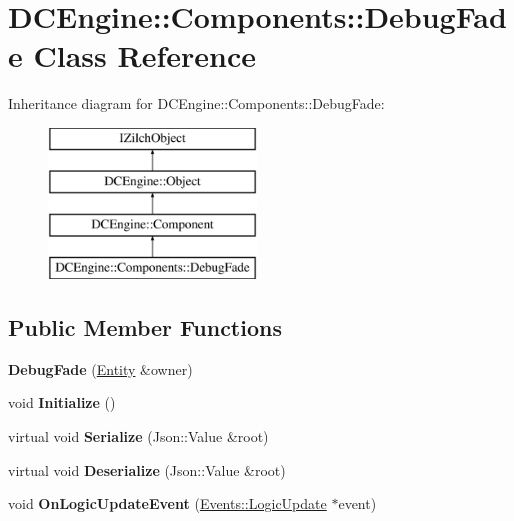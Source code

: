 \hypertarget{classDCEngine_1_1Components_1_1DebugFade}{\section{D\-C\-Engine\-:\-:Components\-:\-:Debug\-Fade Class Reference}
\label{classDCEngine_1_1Components_1_1DebugFade}
}
Inheritance diagram for D\-C\-Engine\-:\-:Components\-:\-:Debug\-Fade\-:\begin{figure}[H]
\begin{center}
\leavevmode
\includegraphics[height=4.000000cm]{classDCEngine_1_1Components_1_1DebugFade}
\end{center}
\end{figure}
\subsection*{Public Member Functions}
\begin{DoxyCompactItemize}
\item 
\hypertarget{classDCEngine_1_1Components_1_1DebugFade_a8625c037a508aa8de8e27bca9d385c1b}{{\bfseries Debug\-Fade} (\hyperlink{classDCEngine_1_1Entity}{Entity} \&owner)}\label{classDCEngine_1_1Components_1_1DebugFade_a8625c037a508aa8de8e27bca9d385c1b}

\item 
\hypertarget{classDCEngine_1_1Components_1_1DebugFade_aecadf44587b7b8549730cdc1bfc3fb6a}{void {\bfseries Initialize} ()}\label{classDCEngine_1_1Components_1_1DebugFade_aecadf44587b7b8549730cdc1bfc3fb6a}

\item 
\hypertarget{classDCEngine_1_1Components_1_1DebugFade_aadb50885d12440dea7e908c6390d0c50}{virtual void {\bfseries Serialize} (Json\-::\-Value \&root)}\label{classDCEngine_1_1Components_1_1DebugFade_aadb50885d12440dea7e908c6390d0c50}

\item 
\hypertarget{classDCEngine_1_1Components_1_1DebugFade_af77bd31f6c310e3ad69a8068847a76b0}{virtual void {\bfseries Deserialize} (Json\-::\-Value \&root)}\label{classDCEngine_1_1Components_1_1DebugFade_af77bd31f6c310e3ad69a8068847a76b0}

\item 
\hypertarget{classDCEngine_1_1Components_1_1DebugFade_a675c986f820f09e75c732b15752ed1c1}{void {\bfseries On\-Logic\-Update\-Event} (\hyperlink{classDCEngine_1_1Events_1_1LogicUpdate}{Events\-::\-Logic\-Update} $\ast$event)}\label{classDCEngine_1_1Components_1_1DebugFade_a675c986f820f09e75c732b15752ed1c1}

\end{DoxyCompactItemize}
